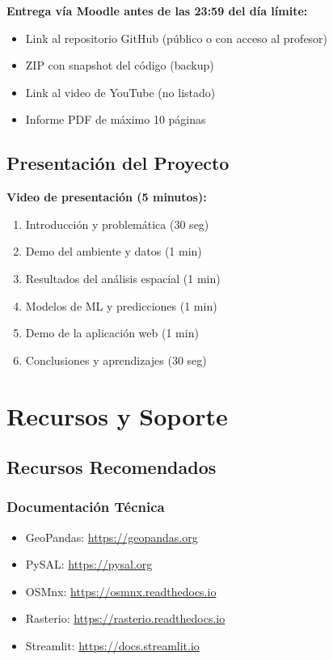 \documentclass[12pt,a4paper]{article}
\begin{document}
\begin{alertbox}
\textbf{Entrega vía Moodle antes de las 23:59 del día límite:}
\begin{itemize}
    \item Link al repositorio GitHub (público o con acceso al profesor)
    \item ZIP con snapshot del código (backup)
    \item Link al video de YouTube (no listado)
    \item Informe PDF de máximo 10 páginas
\end{itemize}
\end{alertbox}

\subsection{Presentación del Proyecto}

\begin{tipbox}
\textbf{Video de presentación (5 minutos):}
\begin{enumerate}
    \item Introducción y problemática (30 seg)
    \item Demo del ambiente y datos (1 min)
    \item Resultados del análisis espacial (1 min)
    \item Modelos de ML y predicciones (1 min)
    \item Demo de la aplicación web (1 min)
    \item Conclusiones y aprendizajes (30 seg)
\end{enumerate}
\end{tipbox}

\section{Recursos y Soporte}

\subsection{Recursos Recomendados}

\subsubsection{Documentación Técnica}
\begin{itemize}
    \item GeoPandas: \url{https://geopandas.org}
    \item PySAL: \url{https://pysal.org}
    \item OSMnx: \url{https://osmnx.readthedocs.io}
    \item Rasterio: \url{https://rasterio.readthedocs.io}
    \item Streamlit: \url{https://docs.streamlit.io}
\end{itemize}
\end{document}
